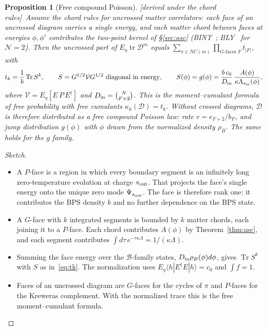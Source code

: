 \documentclass[11pt]{article}
\newcommand{\Tr}{\operatorname{Tr}}
\newcommand{\tr}{\operatorname{tr}}
\newcommand{\Dc}{\mathcal D}
\newcommand{\Vc}{\mathcal V}
\newcommand{\sI}{s_{\rm in}}
\newcommand{\sout}{s_{\rm out}}
\newcommand{\tagbox}[2]{\textsf{\small\color{#1}[#2]}}
\newcommand{\COND}{\tagbox{cconj}{derived under the chord rules}}
\theoremstyle{plain}
\newtheorem{proposition}{Proposition}
\theoremstyle{remark}
\numberwithin{equation}{section}
\begin{document}
\begin{proposition}[Free compound Poisson]\label{prop:fcp}\COND\
Assume the chord rules for uncrossed matter correlators: each face of an uncrossed diagram carries a single energy, and
each matter chord between faces at energies $\phi,\phi'$ contributes the two-point kernel of \S\ref{sec:asc}
(BINT~\cite{BINT}; BLY~\cite[\S5]{BLY} for $\mathcal N=2$). Then the uncrossed part of $E_\eta\tr\Dc^m$ equals
$\sum_{\pi\in NC(m)}\prod_{G\text{-faces }F}t_{|F|}$, with
\begin{equation}\label{eq:tk}
t_k=\frac1b\Tr S^k,\qquad S=G^{1/2}\Vc G^{1/2}\ \text{diagonal in energy},\qquad
S(\phi)=g(\phi)=\frac{b\,c_0}{D_{\rm in}}\,\frac{A(\phi)}{\kappa\Lambda_{\sI}(\phi)} ,
\end{equation}
where $\Vc=E_\eta[E\,P\,E^\dagger]$ and $D_{\rm in}=\binom{N}{F+2}$. This is the moment--cumulant formula of free
probability with free cumulants $\kappa_k(\Dc)=t_k$. Without crossed diagrams, $\Dc$ is therefore distributed as a free
compound Poisson law: rate $r=e_{F+2}/b_F$, and jump distribution $g(\phi)$ with $\phi$ drawn from the normalized
density $\rho_B$. The same holds for the $g$ family.
\end{proposition}

\begin{proof}[Sketch]
\begin{itemize}\itemsep1pt
\item A $P$-face is a region in which every boundary segment is an infinitely long zero-temperature evolution at charge
  $\sout$. That projects the face's single energy onto the unique zero mode $\Psi_{\sout}$. The face is therefore rank
  one: it contributes the BPS density $b$ and no further dependence on the BPS state.
\item A $G$-face with $k$ integrated segments is bounded by $k$ matter chords, each joining it to a $P$-face. Each chord
  contributes $A(\phi)$ by Theorem~\ref{thm:asc}, and each segment contributes $\int d\tau\,e^{-\tau\kappa\Lambda}=1/(\kappa\Lambda)$.
\item Summing the face energy over the $\mathcal B$-family states, $D_{\rm in}\rho_B(\phi)d\phi$, gives
  $\Tr S^k$ with $S$ as in~\eqref{eq:tk}. The normalization uses $E_\eta\langle h|E^\dagger E|h\rangle=c_0$ and
  $\int f=1$.
\item Faces of an uncrossed diagram are $G$-faces for the cycles of $\pi$ and $P$-faces for the Kreweras complement.
  With the normalized trace this is the free moment--cumulant formula.
\end{itemize}
\end{proof}
\end{document}
